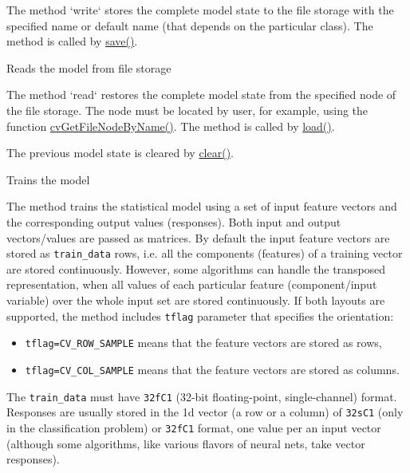 
The method `write` stores the complete model state to the file storage with the specified name or default name (that depends on the particular class). The method is called by \href{#CvStatModel.3A.3Asave}{save()}.



Reads the model from file storage


The method `read` restores the complete model state from the specified node of the file storage. The node must be located by user, for example, using the function \href{opencvref_cxcore.htm#decl_cvGetFileNodeByName}{cvGetFileNodeByName()}. The method is called by \href{#CvStatModel_load}{load()}.

The previous model state is cleared by \href{#CvStatModel_clear}{clear()}.



Trains the model


The method trains the statistical model using a set of input feature vectors and the corresponding output values (responses). Both input and output vectors/values are passed as matrices. By default the input feature vectors are stored as \texttt{train\_data} rows, i.e. all the components (features) of a training vector are stored continuously. However, some algorithms can handle the transposed representation, when all values of each particular feature (component/input variable) over the whole input set are stored continuously. If both layouts are supported, the method includes \texttt{tflag} parameter that specifies the orientation:
\begin{itemize}
 \item \texttt{tflag=CV\_ROW\_SAMPLE} means that the feature vectors are stored as rows,
 \item \texttt{tflag=CV\_COL\_SAMPLE} means that the feature vectors are stored as columns.
\end{itemize}
The \texttt{train\_data} must have \texttt{32fC1} (32-bit floating-point, single-channel) format. Responses are usually stored in the 1d vector (a row or a column) of \texttt{32sC1} (only in the classification problem) or \texttt{32fC1} format, one value per an input vector (although some algorithms, like various flavors of neural nets, take vector responses).

